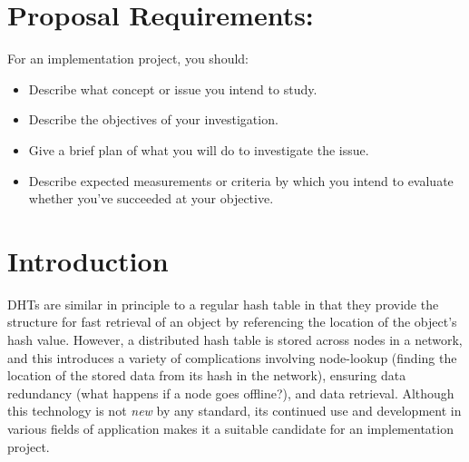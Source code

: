 \documentclass[12pt]{report}
\begin{document}
	
	
	\pagebreak %
	
	\tableofcontents
	
	\pagebreak
	
    \section{Proposal Requirements:}
    For an implementation project, you should:
    \begin{itemize}
        \item Describe what concept or issue you intend to study. 
        \item Describe the objectives of your investigation. 
        \item Give a brief plan of what you will do to investigate the issue. 
        \item Describe expected measurements or criteria by which you intend to
            evaluate whether you've succeeded at your objective.
    \end{itemize}

    \section{Introduction}
    DHTs are similar in principle to a regular hash table in that they
    provide the structure for fast retrieval of an object by referencing the
    location of the object's hash value.  However, a distributed hash table is
    stored across nodes in a network, and this introduces a variety of
    complications involving node-lookup (finding the location of the stored data
    from its hash in the network), ensuring data redundancy (what happens if a
    node goes offline?), and data retrieval.  Although this technology is not
    \textit{new} by any standard, its continued use and development in various
    fields of application makes it a suitable candidate for an implementation
    project.
    
\end{document}
